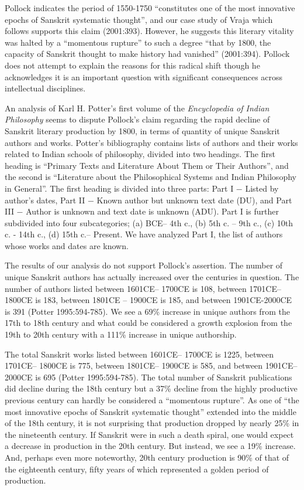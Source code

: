 Pollock indicates the period of 1550-1750 “constitutes one of the most innovative epochs of Sanskrit systematic thought”, and our case study of Vraja which follows supports this claim (2001:393). However, he suggests this literary vitality was halted by a “momentous rupture” to such a degree “that by 1800, the capacity of Sanskrit thought to make history had vanished” (2001:394). Pollock does not attempt to explain the reasons for this radical shift though he acknowledges it is an important question with significant consequences across intellectual disciplines. 

An analysis of Karl H. Potter’s first volume of the {\sl Encyclopedia of Indian Philosophy} seems to dispute Pollock’s claim regarding the rapid decline of Sanskrit literary production by 1800, in terms of quantity of unique Sanskrit authors and works. Potter’s bibliography contains lists of authors and their works related to Indian schools of philosophy, divided into two headings. The first heading is “Primary Texts and Literature About Them or Their Authors”, and the second is “Literature about the Philosophical Systems and Indian Philosophy in General”. The first heading is divided into three parts: Part I − Listed by author’s dates, Part II − Known author but unknown text date (DU), and Part III − Author is unknown and text date is unknown (ADU). Part I is further subdivided into four subcategories; (a) BCE– 4th c., (b) 5th c. – 9th c., (c) 10th c. - 14th c., (d) 15th c.– Present. We have analyzed Part I, the list of authors whose works and dates are known. 

The results of our analysis do not support Pollock’s assertion. The number of unique Sanskrit authors has actually increased over the centuries in question. The number of authors listed between 1601CE– 1700CE is 108, between 1701CE– 1800CE is 183, between 1801CE – 1900CE is 185, and between 1901CE-2000CE is 391 (Potter 1995:594-785). We see a 69\% increase in unique authors from the 17th to 18th century and what could be considered a growth explosion from the 19th to 20th century with a 111\% increase in unique authorship. 

The total Sanskrit works listed between 1601CE– 1700CE is 1225, between 1701CE– 1800CE is 775, between 1801CE– 1900CE is 585, and between 1901CE– 2000CE is 695 (Potter 1995:594-785). The total number of Sanskrit publications did decline during the 18th century but a 37\% decline from the highly productive previous century can hardly be considered a “momentous rupture”. As one of “the most innovative epochs of Sanskrit systematic thought” extended into the middle of the 18th century, it is not surprising that production dropped by nearly 25\% in the nineteenth century. If Sanskrit were in such a death spiral, one would expect a decrease in production in the 20th century. But instead, we see a 19\% increase. And, perhaps even more noteworthy, 20th century production is 90\% of that of the eighteenth century, fifty years of which represented a golden period of production. 

